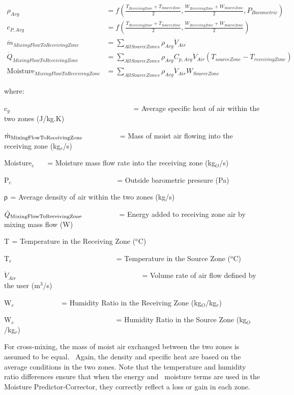 \begin{equation}
 \begin{array}{cl}
    \rho_{Avg} & = f \left( \frac{T_{ReceivingZone} + T_{SourceZone}}{2},\frac{W_{ReceivingZone} + W_{SourceZone}}{2},P_{Barometric} \right) \\
    c_{P,Avg} & = f \left( \frac{T_{ReceivingZone} + T_{SourceZone}}{2},\frac{W_{ReceivingZone} + W_{SourceZone}}{2}\right) \\
    \dot m_{MixingFlowToReceivingZone} & = \sum_{AllSourceZones} \rho_{Avg}\dot V_{Air} \\
    \dot Q_{MixingFlowToReceivingZone} & = \sum_{AllSourceZones} \rho_{Avg}C_{p,Avg}\dot V_{Air}\left(T_{sourceZone}-T_{receivingZone}\right) \\
    \text{Moisture}_{MixingFlowToReceivingZone} & = \sum_{AllSourceZones} \rho_{Avg} \dot V_{Air} W_{SourceZone}
  \end{array}
\end{equation}

where:

c\(_{g}\)~~~~~~~~~~~~~~~~~~~~~~~~~~~~~~~~~~ = Average specific heat of air within the two zones (J/kg.K)

\({\dot m_{{\rm{MixingFlowToReceivingZone}}}}\) ~~~~~~~~~ = Mass of moist air flowing into the receiving zone (kg\(_{r}\)/s)

Moisture\(_{e}\)~~~ = Moisture mass flow rate into the receiving zone (kg\(_{O}\)/s)

P\(_{c}\)~~~~~~~~~~~~~~~~~~~~~~~~~~~~~ = Outside barometric pressure (Pa)

ρ\(_{ }\) = Average density of air within the two zones (kg/s)

\({\dot Q_{{\rm{MixingFlowToReceivingZone}}}}\) ~~~~~~~~~ = Energy added to receiving zone air by mixing mass flow (W)

T\(_{ }\) = Temperature in the Receiving Zone (\(^{o}\)C)

T\(_{e}\) ~~~~~~~~~~~~~~~~~~~~~~~~~~~~ = Temperature in the Source Zone (\(^{o}\)C)

\({\dot V_{Air}}\) ~~~~~~~~~~~~~~~~~~~~~~~~~~~~~~~~~~ = Volume rate of air flow defined by the user (m\(^{3}\)/s)

W\(_{e}\) ~~~~~~~~~~~~ = Humidity Ratio in the Receiving Zone (kg\(_{O}\)/kg\(_{r}\))

W\(_{e}\)~~~~~~~~~~~~~~~~~~~~~~~~~~~~ = Humidity Ratio in the Source Zone (kg\(_{O}\)/kg\(_{r}\))

For cross-mixing, the mass of moist air exchanged between the two zones is assumed to be equal.~ Again, the density and specific heat are based on the average conditions in the two zones. Note that the temperature and humidity ratio differences ensure that when the energy and~ moisture terms are used in the Moisture Predictor-Corrector, they correctly reflect a loss or gain in each zone.

